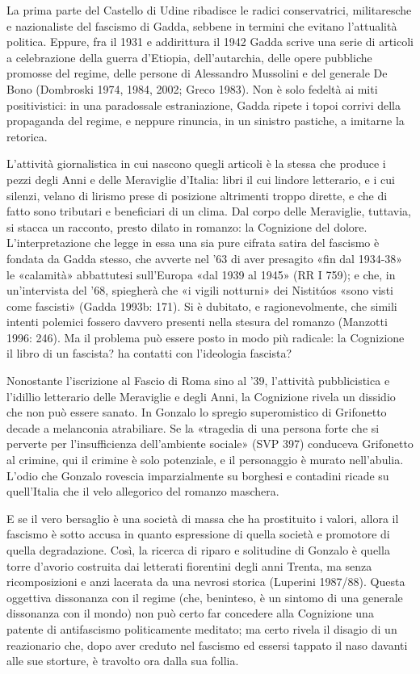 La prima parte del Castello di Udine ribadisce le radici conservatrici, militaresche e nazionaliste del fascismo di Gadda, sebbene in termini che evitano l’attualità politica. Eppure, fra il 1931 e addirittura il 1942 Gadda scrive una serie di articoli a celebrazione della guerra d’Etiopia, dell’autarchia, delle opere pubbliche promosse del regime, delle persone di Alessandro Mussolini e del generale De Bono (Dombroski 1974, 1984, 2002; Greco 1983). Non è solo fedeltà ai miti positivistici: in una paradossale estraniazione, Gadda ripete i topoi corrivi della propaganda del regime, e neppure rinuncia, in un sinistro pastiche, a imitarne la retorica.

L’attività giornalistica in cui nascono quegli articoli è la stessa che produce i pezzi degli Anni e delle Meraviglie d’Italia: libri il cui lindore letterario, e i cui silenzi, velano di lirismo prese di posizione altrimenti troppo dirette, e che di fatto sono tributari e beneficiari di un clima. Dal corpo delle Meraviglie, tuttavia, si stacca un racconto, presto dilato in romanzo: la Cognizione del dolore. L’interpretazione che legge in essa una sia pure cifrata satira del fascismo è fondata da Gadda stesso, che avverte nel ’63 di aver presagito «fin dal 1934-38» le «calamità» abbattutesi sull’Europa «dal 1939 al 1945» (RR I 759); e che, in un’intervista del ’68, spiegherà che «i vigili notturni» dei Nistitúos «sono visti come fascisti» (Gadda 1993b: 171). Si è dubitato, e ragionevolmente, che simili intenti polemici fossero davvero presenti nella stesura del romanzo (Manzotti 1996: 246). Ma il problema può essere posto in modo più radicale: la Cognizione il libro di un fascista? ha contatti con l’ideologia fascista?

Nonostante l’iscrizione al Fascio di Roma sino al ’39, l’attività pubblicistica e l’idillio letterario delle Meraviglie e degli Anni, la Cognizione rivela un dissidio che non può essere sanato. In Gonzalo lo spregio superomistico di Grifonetto decade a melanconia atrabiliare. Se la «tragedia di una persona forte che si perverte per l’insufficienza dell’ambiente sociale» (SVP 397) conduceva Grifonetto al crimine, qui il crimine è solo potenziale, e il personaggio è murato nell’abulia. L’odio che Gonzalo rovescia imparzialmente su borghesi e contadini ricade su quell’Italia che il velo allegorico del romanzo maschera.

E se il vero bersaglio è una società di massa che ha prostituito i valori, allora il fascismo è sotto accusa in quanto espressione di quella società e promotore di quella degradazione. Così, la ricerca di riparo e solitudine di Gonzalo è quella torre d’avorio costruita dai letterati fiorentini degli anni Trenta, ma senza ricomposizioni e anzi lacerata da una nevrosi storica (Luperini 1987/88). Questa oggettiva dissonanza con il regime (che, beninteso, è un sintomo di una generale dissonanza con il mondo) non può certo far concedere alla Cognizione una patente di antifascismo politicamente meditato; ma certo rivela il disagio di un reazionario che, dopo aver creduto nel fascismo ed essersi tappato il naso davanti alle sue storture, è travolto ora dalla sua follia.

